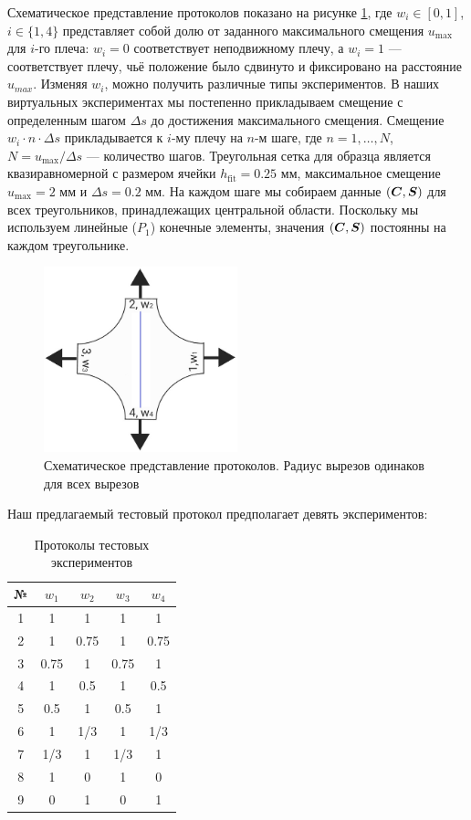 Схематическое представление протоколов показано на рисунке \ref{fig:malt_displacements}, где $w_i \in [0,1]$, $i \in \{1,4\}$
представляет собой долю от заданного максимального смещения $u_{\max}$ для $i$-го плеча: $w_i = 0$ 
соответствует неподвижному плечу, а $w_i = 1$ — соответствует плечу, чьё положение было сдвинуто и фиксировано на расстояние $u_{max}$. 
Изменяя $w_i$, можно получить различные типы экспериментов. 
В наших виртуальных экспериментах мы постепенно 
прикладываем смещение с определенным шагом $\Delta s$ до достижения максимального смещения. 
Смещение $w_i \cdot n \cdot \Delta s$ прикладывается к $i$-му плечу на $n$-м шаге, где $n = 1, \ldots, N$, 
$N = u_{\max}/\Delta s$ — количество шагов. 
Треугольная сетка для образца является квазиравномерной с размером ячейки $h_{\text{fit}} = 0.25$ мм, максимальное смещение 
$u_{\max} = 2$ мм и $\Delta s = 0.2$ мм. 
На каждом шаге мы собираем данные $(\boldsymbol{C}, \boldsymbol{S})$ для всех треугольников, принадлежащих центральной области. 
Поскольку мы используем линейные ($P_1$) конечные элементы, значения $(\boldsymbol{C}, \boldsymbol{S})$ постоянны на каждом треугольнике.

 \begin{figure}[H]
  \centering
  \includegraphics[width=0.5\textwidth]{img/malt_dirichlet.png}
  \caption{Схематическое представление протоколов. 
  Радиус вырезов одинаков для всех вырезов}
  \label{fig:malt_displacements}
\end{figure}
 
Наш предлагаемый тестовый протокол предполагает девять экспериментов:

\begin{table}[H]
\centering
\caption{Протоколы тестовых экспериментов}
\label{tab:test_protocols}
\begin{tabular}{|c|c|c|c|c|}
\hline
\textbf{№} & $w_1$ & $w_2$ & $w_3$ & $w_4$ \\
\hline
1 & 1 & 1 & 1 & 1 \\
2 & 1 & 0.75 & 1 & 0.75 \\
3 & 0.75 & 1 & 0.75 & 1 \\
4 & 1 & 0.5 & 1 & 0.5 \\
5 & 0.5 & 1 & 0.5 & 1 \\
6 & 1 & 1/3 & 1 & 1/3 \\
7 & 1/3 & 1 & 1/3 & 1 \\
8 & 1 & 0 & 1& 0 \\
9 & 0 & 1 & 0 & 1 \\
\hline
\end{tabular}
\end{table}

